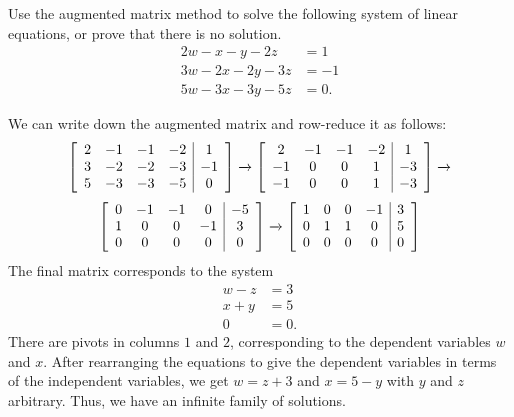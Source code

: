 \documentclass[a4paper]{amsart}
\renewenvironment{solution}{\SolutionInline}{\endSolutionInline}
\begin{document}
\begin{exercise}\label{ex-solve-ii}
 Use the augmented matrix method to solve the following system of
 linear equations, or prove that there is no solution.
 \begin{align*}
  2w - x - y - 2z &= 1 \\
  3w - 2x - 2y - 3z &= -1 \\
  5w - 3x - 3y - 5z &= 0.
 \end{align*}
\end{exercise}
\begin{solution}
 We can write down the augmented matrix and row-reduce it as follows: 
 \[ \left[\begin{array}{cccc|c}
     2 & -1 & -1 & -2 & 1 \\
     3 & -2 & -2 & -3 & -1 \\
     5 & -3 & -3 & -5 & 0 
    \end{array}\right]
    \xrightarrow{}
    \left[\begin{array}{cccc|c}
     2 & -1 & -1 & -2 & 1 \\
    -1 &  0 &  0 &  1 & -3 \\
    -1 &  0 &  0 &  1 & -3 
    \end{array}\right]
    \xrightarrow{}
 \] \[
    \left[\begin{array}{cccc|c}
     0 & -1 & -1 &  0 & -5 \\
     1 &  0 &  0 & -1 & 3 \\
     0 &  0 &  0 &  0 & 0 
    \end{array}\right]
    \xrightarrow{}
    \left[\begin{array}{cccc|c}
     1 &  0 &  0 & -1 & 3 \\
     0 &  1 &  1 &  0 & 5 \\
     0 &  0 &  0 &  0 & 0 
    \end{array}\right]
 \]
 The final matrix corresponds to the system 
 \begin{align*}
  w-z &= 3 \\
  x+y &= 5 \\
  0 &= 0.
 \end{align*}
 There are pivots in columns $1$ and $2$, corresponding to the dependent
 variables $w$ and $x$.  After rearranging the equations to give the
 dependent variables in terms of the independent variables, we get
 $w=z+3$ and $x=5-y$ with $y$ and $z$ arbitrary.  Thus, we have an
 infinite family of solutions.
\end{solution}
\end{document}
